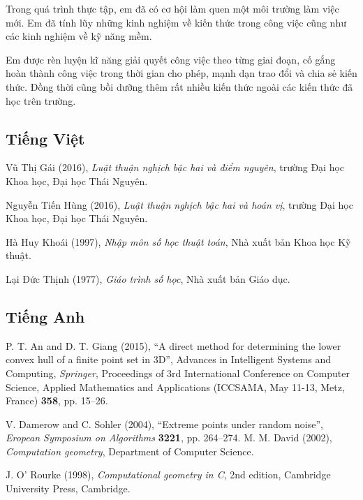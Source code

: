 \documentclass[12pt,a4paper,openany,oneside]{report}
\begin{document}
 Trong quá trình thực tập, em đã có cơ hội làm quen một môi trường làm việc mới. Em đã tính lũy những kinh nghiệm về kiến thức trong công việc cũng như các kinh nghiệm về kỹ năng mềm.
 
 Em được rèn luyện kĩ năng giải quyết công việc theo từng giai đoạn, cố gắng hoàn thành công việc trong thời gian cho phép, mạnh dạn trao đổi và chia sẻ kiến thức. Đồng thời cũng bồi dưỡng thêm rất nhiều kiến thức ngoài các kiến thức đã học trên trường.
 




\begin{thebibliography}{30}
	
\subsection*{Tiếng Việt}

 Vũ Thị Gái (2016), \textit{Luật thuận nghịch bậc hai và điểm nguyên}, trường Đại học Khoa học, Đại học Thái Nguyên.

 Nguyễn Tiến Hùng (2016), \textit{Luật thuận nghịch bậc hai và hoán vị}, trường Đại học Khoa học, Đại học Thái Nguyên.


 Hà Huy Khoái (1997), \textit{Nhập môn số học thuật toán}, Nhà xuất bản Khoa học Kỹ thuật.

 Lại Đức Thịnh (1977), {\it Giáo trình số học}, Nhà xuất bản Giáo dục.
	
\subsection*{Tiếng Anh}
	 P. T. An and D. T. Giang (2015), ``A direct method for determining the lower convex hull of a finite point set in 3D'', Advances in Intelligent Systems and Computing, \textit{Springer}, Proceedings of 3rd International Conference on Computer Science, Applied Mathematics and Applications (ICCSAMA, May 11-13, Metz, France) \textbf{358},  pp. 15--26.


 V. Damerow and C. Sohler (2004), ``Extreme points under random noise'', \textit{Eropean Symposium on Algorithms} {\bf 3221}, pp. 264--274.
  M. M. David (2002), \textit{Computation geometry}, Department of Computer Science.

 J. O' Rourke (1998), \textit{Computational geometry in C}, 2nd edition, Cambridge University Press, Cambridge. 
	
\end{thebibliography} 
\end{document}

